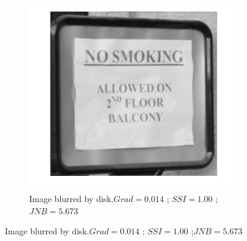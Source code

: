 \begin{figure}[H]
\begin{subfigure}[b]{0.3\textwidth}
        \end{subfigure}
        \hspace{.6cm}
        \begin{subfigure}[b]{0.3\textwidth}
                 \centering
                 \includegraphics[width=\textwidth]{sign_D.jpg}
                 \caption{\fontsize{10}{1} \selectfont Image blurred by disk.\newline $Grad=0.014$ ; $SSI=1.00$ ;\newline $JNB=5.673$}
                       

\end{subfigure}
\end{figure}

